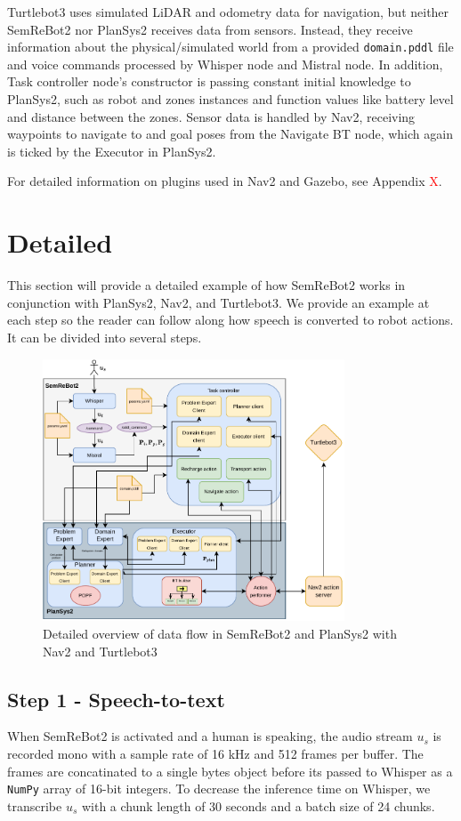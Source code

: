 Turtlebot3 uses simulated LiDAR and odometry data for navigation, but neither SemReBot2 nor PlanSys2 receives data from sensors. Instead, they receive information about the physical/simulated world from a provided \verb|domain.pddl| file and voice commands processed by Whisper node and Mistral node. In addition, Task controller node's constructor is passing constant initial knowledge to PlanSys2, such as robot and zones instances and function values like battery level and distance between the zones. Sensor data is handled by Nav2, receiving waypoints to navigate to and goal poses from the Navigate BT node, which again is ticked by the Executor in PlanSys2.

For detailed information on plugins used in Nav2 and Gazebo, see Appendix \textcolor{red}{X}.

\section{Detailed}
This section will provide a detailed example of how SemReBot2 works in conjunction with PlanSys2, Nav2, and Turtlebot3. We provide an example at each step so the reader can follow along how speech is converted to robot actions. It can be divided into several steps.

\begin{figure}
    \centering
    \includegraphics[width=0.8\textwidth]{figures/semrebot2.pdf}
    \caption[SemReBot2 detailed overview]{Detailed overview of data flow in SemReBot2 and PlanSys2 with Nav2 and Turtlebot3}
    \label{fig:semrebot2}
\end{figure}

\subsection{Step 1 - Speech-to-text}
When SemReBot2 is activated and a human is speaking, the audio stream $u_{s}$ is recorded mono with a sample rate of 16 kHz and 512 frames per buffer. The frames are concatinated to a single bytes object before its passed to Whisper as a \verb|NumPy| array of 16-bit integers. To decrease the inference time on Whisper, we transcribe $u_{s}$ with a chunk length of 30 seconds and a batch size of 24 chunks.

